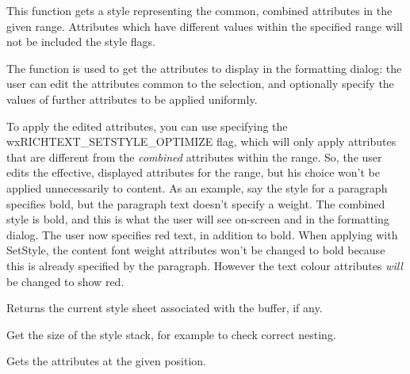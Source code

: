\label{wxrichtextbuffergetstyleforrange}


This function gets a style representing the common, combined attributes in the given range.
Attributes which have different values within the specified range will not be included the style
flags.

The function is used to get the attributes to display in the formatting dialog: the user
can edit the attributes common to the selection, and optionally specify the values of further
attributes to be applied uniformly.

To apply the edited attributes, you can use  specifying
the wxRICHTEXT\_SETSTYLE\_OPTIMIZE flag, which will only apply attributes that are different
from the {\it combined} attributes within the range. So, the user edits the effective, displayed attributes
for the range, but his choice won't be applied unnecessarily to content. As an example,
say the style for a paragraph specifies bold, but the paragraph text doesn't specify a weight. The
combined style is bold, and this is what the user will see on-screen and in the formatting
dialog. The user now specifies red text, in addition to bold. When applying with
SetStyle, the content font weight attributes won't be changed to bold because this is already specified
by the paragraph. However the text colour attributes {\it will} be changed to
show red.

\label{wxrichtextbuffergetstylesheet}


Returns the current style sheet associated with the buffer, if any.

\label{wxrichtextbuffergetstylestacksize}


Get the size of the style stack, for example to check correct nesting.

\label{wxrichtextbuffergetuncombinedstyle}


Gets the attributes at the given position.

